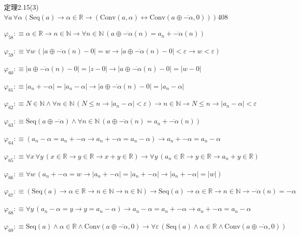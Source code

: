 \begin{fullproof}{定理2.15(3)}{$\forall a\,\forall \alpha\,(\mathrm{Seq}(a) \to \alpha \in \mathbb{R} \to (\mathrm{Conv}(a,\alpha) \leftrightarrow \mathrm{Conv}(a \oplus \overline{-\alpha},0)))$}{408}
\begin{abbrevlist}
\item $\varphi_{58} :\equiv \alpha \in \mathbb{R} \to n \in \mathbb{N} \to \forall n \in \mathbb{N}\,(a \oplus \overline{-\alpha}(n) = a_{n} + \overline{-\alpha}(n))$
\item $\varphi_{59} :\equiv \forall w\,(\lvert a \oplus \overline{-\alpha}(n) - 0 \rvert = w \to \lvert a \oplus \overline{-\alpha}(n) - 0 \rvert < \varepsilon \to w < \varepsilon)$
\item $\varphi_{60} :\equiv \lvert a \oplus \overline{-\alpha}(n) - 0 \rvert = \lvert z - 0 \rvert \to \lvert a \oplus \overline{-\alpha}(n) - 0 \rvert = \lvert w - 0 \rvert$
\item $\varphi_{61} :\equiv \lvert a_{n} + -\alpha \rvert = \lvert a_{n} - \alpha \rvert \to \lvert a \oplus \overline{-\alpha}(n) - 0 \rvert = \lvert a_{n} - \alpha \rvert$
\item $\varphi_{62} :\equiv N \in \mathbb{N} \land \forall n \in \mathbb{N}\,(N \leq n \to \lvert a_{n} - \alpha \rvert < \varepsilon) \to n \in \mathbb{N} \to N \leq n \to \lvert a_{n} - \alpha \rvert < \varepsilon$
\item $\varphi_{63} :\equiv \mathrm{Seq}(a \oplus \overline{-\alpha}) \land \forall n \in \mathbb{N}\,(a \oplus \overline{-\alpha}(n) = a_{n} + \overline{-\alpha}(n))$
\item $\varphi_{64} :\equiv (a_{n} - \alpha = a_{n} + -\alpha \to a_{n} + -\alpha = a_{n} - \alpha) \to a_{n} + -\alpha = a_{n} - \alpha$
\item $\varphi_{65} :\equiv \forall x\,\forall y\,(x \in \mathbb{R} \to y \in \mathbb{R} \to x + y \in \mathbb{R}) \to \forall y\,(a_{n} \in \mathbb{R} \to y \in \mathbb{R} \to a_{n} + y \in \mathbb{R})$
\item $\varphi_{66} :\equiv \forall w\,(a_{n} + -\alpha = w \to \lvert a_{n} + -\alpha \rvert = \lvert a_{n} + -\alpha \rvert \to \lvert a_{n} + -\alpha \rvert = \lvert w \rvert)$
\item $\varphi_{67} :\equiv (\mathrm{Seq}(a) \to \alpha \in \mathbb{R} \to n \in \mathbb{N} \to n \in \mathbb{N}) \to \mathrm{Seq}(a) \to \alpha \in \mathbb{R} \to n \in \mathbb{N} \to \overline{-\alpha}(n) = -\alpha$
\item $\varphi_{68} :\equiv \forall y\,(a_{n} - \alpha = y \to y = a_{n} - \alpha) \to a_{n} - \alpha = a_{n} + -\alpha \to a_{n} + -\alpha = a_{n} - \alpha$
\item $\varphi_{69} :\equiv \mathrm{Seq}(a) \land \alpha \in \mathbb{R} \land \mathrm{Conv}(a \oplus \overline{-\alpha},0) \to \forall \varepsilon\,(\mathrm{Seq}(a) \land \alpha \in \mathbb{R} \land \mathrm{Conv}(a \oplus \overline{-\alpha},0))$

\end{abbrevlist}
\end{fullproof}

